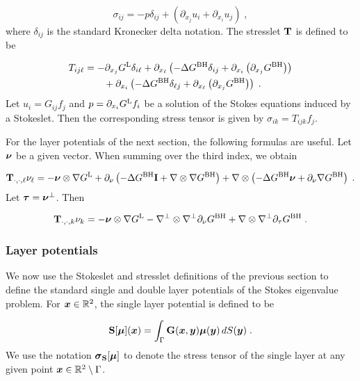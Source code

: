 \begin{equation}
  \sigma_{ij} = -p \delta_{ij} + \left ( \partial_{x_j}u_i
  +\partial_{x_i} u_j \right ) \; , \nonumber
\end{equation}
where $\delta_{ij}$ is the standard Kronecker delta notation.
The stresslet ${\bf T}$ is defined to be

\begin{align}
  T_{ij\ell} &= - \partial_{x_j} G^{\textrm{L}} \delta_{i\ell}
  + \partial_{x_\ell} \left ( -\Delta G^{\textrm{BH}} \delta_{ij} +
  \partial_{x_i} \left(\partial_{x_j} G^{\textrm{BH}} \right) \right)
  \nonumber \\
  & \qquad+ \partial_{x_i} \left ( -\Delta G^{\textrm{BH}} \delta_{\ell j} +
  \partial_{x_\ell} \left(\partial_{x_j} G^{\textrm{BH}} \right) \right)
  \; . \label{eq:ostress} \nonumber
\end{align}
Let $u_i = G_{ij} f_j$ and $p = \partial_{x_i} G^{\textrm{L}} f_i$ be a
solution of the Stokes equations induced by a Stokeslet.
Then the corresponding stress tensor is given by
$\sigma_{ik} = T_{ijk} f_j$.

For the layer potentials of the next section, the following
formulas are useful. Let ${\boldsymbol \nu}$ be a given vector. When
summing over the third index, we obtain

\begin{equation}
  {\bf T}_{\cdot,\cdot,\ell} \nu_\ell = -{\boldsymbol \nu} \otimes \nabla G^{\textrm{L}}
  + \partial_\nu \left ( -\Delta G^{\textrm{BH}} {\bf I}
  + \nabla \otimes \nabla G^{\textrm{BH}} \right)
  + \nabla \otimes \left ( -\Delta G^{\textrm{BH}} {\boldsymbol \nu}
  + \partial_{\nu} \nabla G^{\textrm{BH}} \right) \; . \nonumber
\end{equation}
Let ${\boldsymbol \tau} = {\boldsymbol \nu}^\bot$. Then

\begin{equation}
  {\bf T}_{\cdot,\cdot,k} \nu_k = -{\boldsymbol \nu} \otimes \nabla G^{\textrm{L}}
  - \nabla^\bot \otimes \nabla^\bot \partial_\nu G^{\textrm{BH}}
  +\nabla \otimes \nabla^\bot \partial_\tau G^{\textrm{BH}} \; .
  \nonumber
\end{equation}

\subsubsection{Layer potentials}

We now use the Stokeslet and stresslet definitions
of the previous section to define the standard single
and double layer potentials of the Stokes eigenvalue
problem. For ${\boldsymbol x} \in \mathbb{R}^2$, the single layer potential
is defined to be

\begin{equation} \label{eq:singlelayer}
  {\bf S} [{\boldsymbol \mu}] ({\boldsymbol x}) = \int_\Gamma {\bf G} ({\boldsymbol x},{\boldsymbol y}) {\boldsymbol \mu}({\boldsymbol y})
  \, dS({\boldsymbol y}) \; .
\end{equation}
We use the notation ${\boldsymbol \sigma}_{\bf S}[{\boldsymbol \mu}]$ to denote the
stress tensor of the single layer at any given point
${\boldsymbol x} \in \mathbb{R}^2 \setminus \Gamma$.

